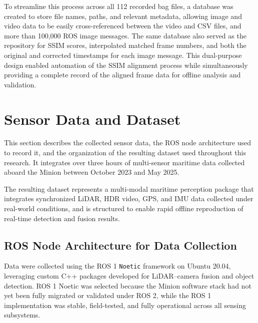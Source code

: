 \documentclass{erauthesis}
\begin{document}
To streamline this process across all 112 recorded bag files, a database was created to store file names, paths, and relevant metadata, allowing image and video data to be easily cross-referenced between the video and CSV files, and more than 100,000 ROS image messages. 
The same database also served as the repository for SSIM scores, interpolated matched frame numbers, and both the original and corrected timestamps for each image message. 
This dual-purpose design enabled automation of the SSIM alignment process while simultaneously providing a complete record of the aligned frame data for offline analysis and validation.

\section{Sensor Data and Dataset}
\label{sec:sensor_data_dataset}


This section describes the collected sensor data, the ROS node architecture used to record it, 
and the organization of the resulting dataset used throughout this research.  
It integrates over three hours of multi-sensor maritime data collected aboard the Minion between October 2023 and May 2025.

The resulting dataset represents a multi-modal maritime perception package that integrates synchronized LiDAR, HDR video, GPS, and IMU data collected under real-world conditions, and is structured to enable rapid offline reproduction of real-time detection and fusion results.


\subsection{ROS Node Architecture for Data Collection}
\label{sec:ros_architecture}

Data were collected using the ROS 1 \texttt{Noetic} framework on Ubuntu 20.04, 
leveraging custom C++ packages developed for LiDAR–camera fusion and object detection.  
ROS 1 Noetic was selected because the Minion software stack had not yet been fully migrated or validated under ROS 2, while the ROS 1 implementation was stable, field-tested, and fully operational across all sensing subsystems.
\end{document}
